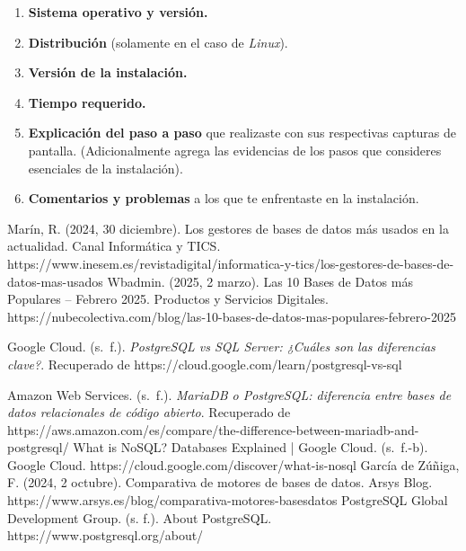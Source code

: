 \documentclass[12pt]{report}
\begin{document}
\begin{enumerate}[label=\roman*.]
\begin{enumerate}[label=\textbf{\arabic*.}, leftmargin=*, itemsep=0.8em]
  \item \textbf{Sistema operativo y versión.}
  \item \textbf{Distribución} (solamente en el caso de \textit{Linux}).
  \item \textbf{Versión de la instalación.}
  \item \textbf{Tiempo requerido.}
  \item \textbf{Explicación del paso a paso} que realizaste con sus respectivas capturas de pantalla. (Adicionalmente agrega las evidencias de los pasos que consideres esenciales de la instalación).
  \item \textbf{Comentarios y problemas} a los que te enfrentaste en la instalación.
\end{enumerate}

\end{enumerate}

\begin{thebibliography}{99}
        Marín, R. (2024, 30 diciembre). Los gestores de bases de datos más usados en la actualidad. Canal Informática y TICS. https://www.inesem.es/revistadigital/informatica-y-tics/los-gestores-de-bases-de-datos-mas-usados
        Wbadmin. (2025, 2 marzo). Las 10 Bases de Datos más Populares – Febrero 2025. Productos y Servicios Digitales. https://nubecolectiva.com/blog/las-10-bases-de-datos-mas-populares-febrero-2025

        Google Cloud. (s. f.). \textit{PostgreSQL vs SQL Server: ¿Cuáles son las diferencias clave?}. Recuperado de https://cloud.google.com/learn/postgresql-vs-sql

        Amazon Web Services. (s. f.). \textit{MariaDB o PostgreSQL: diferencia entre bases de datos relacionales de código abierto}. Recuperado de https://aws.amazon.com/es/compare/the-difference-between-mariadb-and-postgresql/
        What is NoSQL? Databases Explained | Google Cloud. (s. f.-b). Google Cloud. https://cloud.google.com/discover/what-is-nosql
        García de Zúñiga, F. (2024, 2 octubre). Comparativa de motores de bases de datos. Arsys Blog. https://www.arsys.es/blog/comparativa-motores-basesdatos
        PostgreSQL Global Development Group. (s. f.). About PostgreSQL. https://www.postgresql.org/about/
\end{thebibliography}
\end{document}
